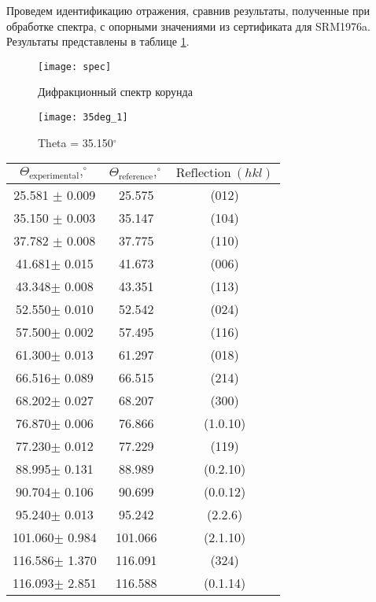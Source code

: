 \documentclass[a4paper]{article}
\begin{document}
Проведем идентификацию отражения, сравнив результаты, полученные при обработке спектра, с опорными значениями из сертификата для SRM1976a. Результаты представлены в таблице \ref{tab1}.

\begin{figure}[h!]
		\begin{center}
			\texttt{[image: spec]}
			\caption{Дифракционный спектр корунда}
			\label{ris:ris1}
		\end{center}	
	\end{figure}

	\begin{figure}[h!]
		\begin{center}
			\texttt{[image: 35deg\_1]}
			\caption{Theta = 35.150$^\circ$}
			\label{ris:ris2}
		\end{center}	
	\end{figure}

\begin{table}[h!]
		\centering
		\begin{tabular}{|c|c|c|}
			\hline
			\rowcolor[rgb]{0.86,1,1} $\Theta_{\text{experimental}}, ^\circ$& $\Theta_{\text{reference}}, ^\circ$ & $\text{Reflection}~(hkl)$\\
			\hline 
			 25.581 $\pm$ 0.009 & 25.575 & (012) \\
			 \hline 
			 35.150 $\pm$ 0.003& 35.147 & (104) \\ 
			 \hline 
			 37.782 $\pm$ 0.008& 37.775 & (110) \\ 
			 \hline 
			 41.681$\pm$ 0.015& 41.673 & (006) \\ 
			 \hline 
			 43.348$\pm$ 0.008& 43.351 & (113) \\ 
			 \hline 
			 52.550$\pm$ 0.010& 52.542 & (024) \\ 
			 \hline 
			 57.500$\pm$ 0.002& 57.495 & (116) \\ 
			 \hline 
			 61.300$\pm$ 0.013& 61.297 & (018) \\ 
			 \hline 
			 66.516$\pm$ 0.089& 66.515 & (214) \\ 
			 \hline 
			 68.202$\pm$ 0.027& 68.207 & (300) \\ 
			 \hline 
			 76.870$\pm$ 0.006& 76.866 & (1.0.10) \\ 
			 \hline 
			 77.230$\pm$ 0.012& 77.229 & (119) \\ 
			 \hline 
			 88.995$\pm$ 0.131& 88.989 & (0.2.10) \\ 
			 \hline 
			 90.704$\pm$ 0.106& 90.699 & (0.0.12) \\ 
			 \hline 
			 95.240$\pm$ 0.013& 95.242 & (2.2.6) \\ 
			 \hline 
			 101.060$\pm$ 0.984& 101.066 & (2.1.10) \\ 
			 \hline 
			 116.586$\pm$ 1.370& 116.091 & (324) \\ 
			 \hline 
			 116.093$\pm$ 2.851& 116.588 & (0.1.14) \\
			 \hline
		\end{tabular}
		\label{tab1}
	\end{table}
	\vspace{0.5pt}
	
\end{document}
